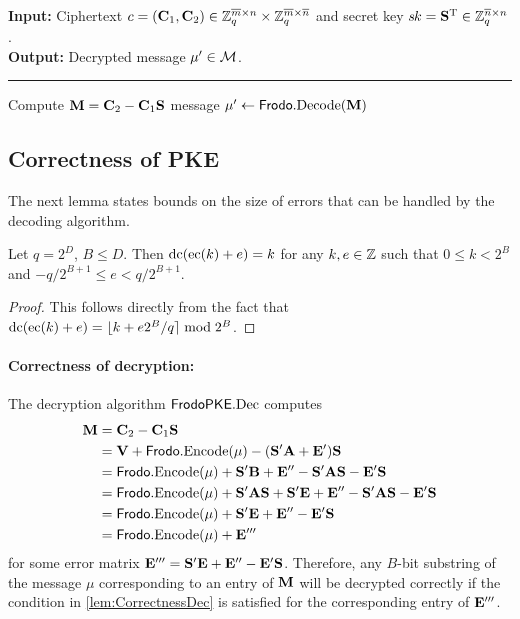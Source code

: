 \begin{algorithm}[t]
\caption{\label{alg:PKE:Dec} $\FrodoPKE.\Dec$.}
{\bf Input:} Ciphertext $c=(\mathbf{C}_1, \mathbf{C}_2)  \in \mathbb{Z}_q^{\overline{m}\times n}\times \mathbb{Z}_q^{\overline{m}\times\overline{n}}$ and secret key $s\mkern-1muk = \mathbf{S}^\text{T} \in \mathbb{Z}_q^{\overline{n} \times n}$.\\
{\bf Output:} Decrypted message $\mu' \in \mathcal{M}$.\\[-1.5ex]
\rule{\linewidth}{.5pt}
\vspace{-0.5cm}
\begin{algorithmic}[1]
    \STATE Compute $\mathbf{M} = \mathbf{C}_2 - \mathbf{C}_1\mathbf{S}$
    \RETURN message $\mu' \gets \textsf{\upshape\mdseries Frodo}.\textrm{\upshape\mdseries Decode}(\mathbf{M})$
\end{algorithmic}
\end{algorithm}
   

\subsection{Correctness of \INDCPA PKE}\label{sec:cpa-pke-correctness}

The next lemma states bounds on the size of errors that can be handled
by the decoding algorithm.

\begin{lemma}\label{lem:CorrectnessDec}
  Let $q = 2^D$, $B \leq D$. Then $\textrm{\upshape\mdseries dc}(\textrm{\upshape\mdseries ec}(k)+e) = k$ for any
  $k,e\in \mathbb{Z}$ such that $0\leq k <2^B$ and
  $-q/2^{B+1} \leq e < q/2^{B+1}$.
\end{lemma}

\begin{proof}
  This follows directly from the fact that
  $\textrm{\upshape\mdseries dc}(\textrm{\upshape\mdseries ec}(k)+e) = \lfloor k + e2^B/q \rceil \bmod 2^B$.
\end{proof}

\paragraph{Correctness of decryption:}
The decryption algorithm $\FrodoPKE.\Dec$ computes 
\begin{align*}
\mathbf{M} 
&= \mathbf{C}_2 - \mathbf{C}_1\mathbf{S} \\
&= \mathbf{V} + \textsf{\upshape\mdseries Frodo}.\textrm{\upshape\mdseries Encode}(\mu) - (\mathbf{S}'\mathbf{A} + \mathbf{E}')\mathbf{S} \\
&= \textsf{\upshape\mdseries Frodo}.\textrm{\upshape\mdseries Encode}(\mu) + \mathbf{S}'\mathbf{B} + \mathbf{E}'' - \mathbf{S}'\mathbf{A}\mathbf{S} - \mathbf{E}'\mathbf{S} \\
&= \textsf{\upshape\mdseries Frodo}.\textrm{\upshape\mdseries Encode}(\mu) + \mathbf{S}'\mathbf{A}\mathbf{S} + \mathbf{S}'\mathbf{E} +  \mathbf{E}'' - \mathbf{S}'\mathbf{A}\mathbf{S} - \mathbf{E}'\mathbf{S} \\
&= \textsf{\upshape\mdseries Frodo}.\textrm{\upshape\mdseries Encode}(\mu) + \mathbf{S}'\mathbf{E} + \mathbf{E}''- \mathbf{E}'\mathbf{S} \\
&= \textsf{\upshape\mdseries Frodo}.\textrm{\upshape\mdseries Encode}(\mu) + \mathbf{E}'''
\end{align*}
for some error matrix $\mathbf{E}''' = \mathbf{S}' \mathbf{E} + \mathbf{E}'' - \mathbf{E}'
\mathbf{S}$. Therefore, any $B$-bit substring of the message $\mu$
corresponding to an entry of $\mathbf{M}$ will be decrypted correctly if the
condition in \autoref{lem:CorrectnessDec} is satisfied for the
corresponding entry of $\mathbf{E}'''$.

